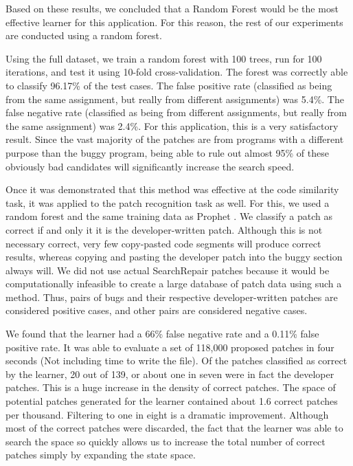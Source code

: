 \documentclass[conference]{IEEEtran}
\begin{document}
Based on these results, we concluded that a Random Forest would be the most effective learner for this application. 
For this reason, the rest of our experiments are conducted using a random forest.


Using the full dataset, we train a random forest with 100 trees, run for 100 iterations, and test it using 10-fold cross-validation. 
The forest was correctly able to classify 96.17\% of the test cases. The false positive rate (classified as being from the same assignment, but really from different assignments) was 5.4\%. 
The false negative rate (classified as being from different assignments, but really from the same assignment)  was 2.4\%. 
For this application, this is a very satisfactory result. 
Since the vast majority of the patches are from programs with a different purpose than the buggy program, being able to rule out almost 95\% of these obviously bad candidates will significantly increase the search speed. 

Once it was demonstrated that this method was effective at the code similarity task, it was applied to the patch recognition task as well. 
For this, we used a random forest and the same training data as Prophet \cite{Prophet}. 
We classify a patch as correct if and only it it is the developer-written patch. Although this is not necessary correct, very few copy-pasted code segments will produce correct results, whereas copying and pasting the developer patch into the buggy section always will. 
We did not use actual SearchRepair patches because it would be computationally infeasible to create a large database of patch data using such a method. 
Thus, pairs of bugs and their respective developer-written patches are considered positive cases, and other pairs are considered negative cases. 


We found that the learner had a 66\% false negative rate and a 0.11\% false positive rate. 
It was able to evaluate a set of 118,000 proposed patches in four seconds (Not including time to write the file). 
Of the patches classified as correct by the learner, 20 out of 139, or about one in seven were in fact the developer patches. 
This is a huge increase in the density of correct patches. 
The space of potential patches generated for the learner contained about 1.6 correct patches per thousand. 
Filtering to one in eight is a dramatic improvement. 
Although most of the correct patches were discarded, the fact that the learner was able to search the space so quickly allows us to increase the total number of correct patches simply by expanding the state space. 
\end{document}
